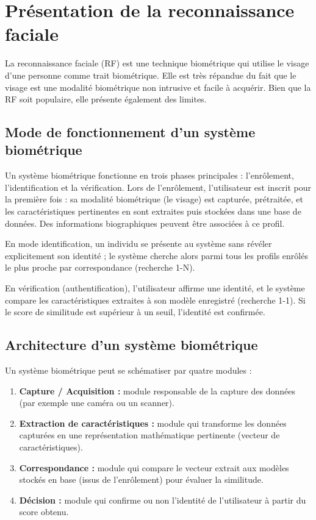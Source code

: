\documentclass[11pt,a4paper]{article}
\begin{document}
	\newpage
	
	\section{ Présentation de la reconnaissance faciale}
	
	\vspace{0.5cm}
	La reconnaissance faciale (RF) est une technique biométrique qui utilise le visage d’une personne comme trait biométrique. Elle est très répandue du fait que le visage est une modalité biométrique non intrusive et facile à acquérir. Bien que la RF soit populaire, elle présente également des limites. 
	\vspace{0.5cm}
	\subsection{Mode de fonctionnement d’un système biométrique}
	Un système biométrique fonctionne en trois phases principales : l’enrôlement, l’identification et la vérification. Lors de l’enrôlement, l’utilisateur est inscrit pour la première fois : sa modalité biométrique (le visage) est capturée, prétraitée, et les caractéristiques pertinentes en sont extraites puis stockées dans une base de données. Des informations biographiques peuvent être associées à ce profil. 
	
	En mode identification, un individu se présente au système sans révéler explicitement son identité ; le système cherche alors parmi tous les profils enrôlés le plus proche par correspondance (recherche 1-N). 
	
	En vérification (authentification), l’utilisateur affirme une identité, et le système compare les caractéristiques extraites à son modèle enregistré (recherche 1-1). Si le score de similitude est supérieur à un seuil, l’identité est confirmée.
	\vspace{0.5cm}
	\subsection{Architecture d’un système biométrique}
	Un système biométrique peut se schématiser par quatre modules :
	\begin{enumerate}
		\item \textbf{Capture / Acquisition :} module responsable de la capture des données (par exemple une caméra ou un scanner).
		\item \textbf{Extraction de caractéristiques :} module qui transforme les données capturées en une représentation mathématique pertinente (vecteur de caractéristiques).
		\item \textbf{Correspondance :} module qui compare le vecteur extrait aux modèles stockés en base (issus de l’enrôlement) pour évaluer la similitude.
		\item \textbf{Décision :} module qui confirme ou non l’identité de l’utilisateur à partir du score obtenu.
	\end{enumerate}
	
\end{document}
